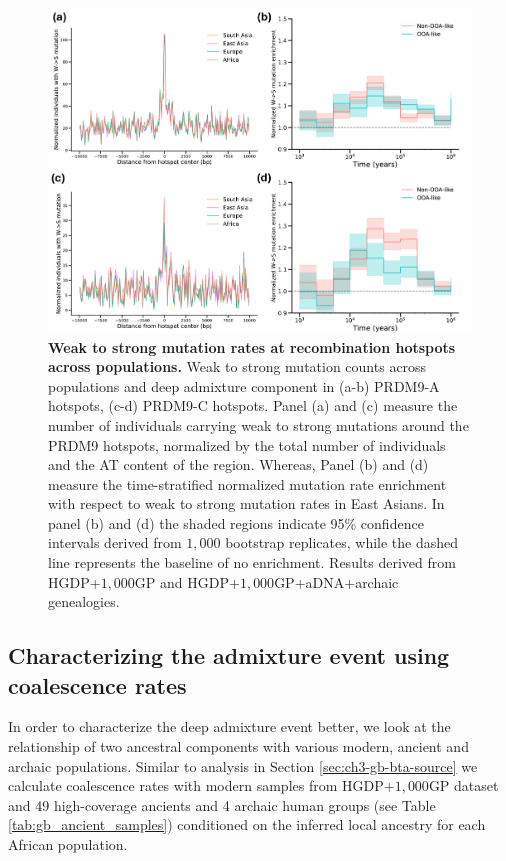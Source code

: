 \begin{figure}[h!]
    \centering
    \includegraphics[width=\linewidth]{figures/gb_deepadmix/gb_real_deep_4.pdf}
    \captionsetup{width=\textwidth+3cm}
    \caption{
    \footnotesize
    \textbf{Weak to strong mutation rates at recombination hotspots across populations.} Weak to strong mutation counts across populations and deep admixture component in (a-b) PRDM9-A hotspots, (c-d) PRDM9-C hotspots. Panel (a) and (c) measure the number of individuals carrying weak to strong mutations around the PRDM9 hotspots, normalized by the total number of individuals and the AT content of the region. Whereas, Panel (b) and (d) measure the time-stratified normalized mutation rate enrichment with respect to weak to strong mutation rates in East Asians. In panel (b) and (d) the shaded regions indicate 95\% confidence intervals derived from $1{,}000$ bootstrap replicates, while the dashed line represents the baseline of no enrichment. Results derived from HGDP+$1{,}000$GP and HGDP+$1{,}000$GP+aDNA+archaic genealogies.
    }
    \label{fig:gb_deepadmix_prdm9_hotspot}
\end{figure}

\clearpage

\subsection{Characterizing the admixture event using coalescence rates}

In order to characterize the deep admixture event better, we look at the relationship of two ancestral components with various modern, ancient and archaic populations. Similar to analysis in Section \ref{sec:ch3-gb-bta-source} we calculate coalescence rates with modern samples from HGDP+$1{,}000$GP dataset and 49 high-coverage ancients and 4 archaic human groups (see Table \ref{tab:gb_ancient_samples}) conditioned on the inferred local ancestry for each African population. 

